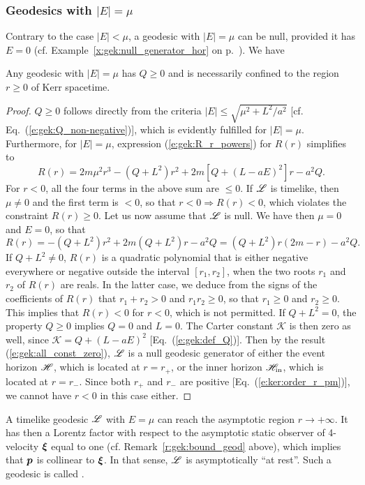 \subsubsection{Geodesics with $|E|=\mu$}

Contrary to the case $|E|<\mu$, a geodesic with $|E|=\mu$ can be null,
provided it has $E=0$
(cf. Example~\ref{x:gek:null_generator_hor} on p.~\pageref{x:gek:null_generator_hor}).
We have
\begin{prop}
Any geodesic with $|E|=\mu$ has $Q\geq 0$ and is necessarily confined
to the region $r\geq 0$ of Kerr spacetime.
\end{prop}
\begin{proof}
$Q\geq 0$ follows directly from the criteria $|E| \leq \sqrt{\mu^2 + {L^2}/{a^2}}$
[cf. Eq.~(\ref{e:gek:Q_non-negative})],
which is evidently fulfilled for $|E|=\mu$.
Furthermore, for $|E|=\mu$, expression (\ref{e:gek:R_r_powers}) for $R(r)$
simplifies to
\[
    R(r) =  2 m \mu^2 r^3 - (Q + L^2) r^2 + 2m  \left[Q + (L-aE)^2 \right] r - a^2 Q .
\]
For $r<0$, all the four terms in the above sum are $\leq 0$.
If $\mathscr{L}$ is timelike, then $\mu\neq 0$ and the first term is $<0$, so that
$r<0 \Longrightarrow R(r) < 0$, which violates the constraint
$R(r) \geq 0$. Let us now assume that $\mathscr{L}$ is null.
We have then $\mu=0$ and $E=0$, so that
\[
    R(r) = - (Q + L^2) r^2 + 2m  (Q + L^2) r -a^2 Q = (Q+L^2) r ( 2m - r) -a^2 Q.
\]
If $Q + L^2 \neq 0$, $R(r)$ is a quadratic polynomial that is
either negative everywhere or negative outside the interval $[r_1, r_2]$,
when the two roots $r_1$ and $r_2$ of $R(r)$ are reals. In the latter case, we deduce
from the signs of the coefficients of $R(r)$ that $r_1+r_2 > 0$ and $r_1 r_2 \geq 0$,
so that $r_1 \geq 0$ and $r_2 \geq 0$. This implies that $R(r) < 0$ for
$r<0$, which is not permitted.
If $Q + L^2 = 0$, the property $Q\geq 0$ implies $Q=0$ and $L = 0$.
The Carter constant $\mathscr{K}$ is then zero as well, since
$\mathscr{K} = Q + (L - a E)^2$ [Eq.~(\ref{e:gek:def_Q})].
Then by the result (\ref{e:gek:all_const_zero}), $\mathscr{L}$ is a null geodesic
generator of either the event horizon $\mathscr{H}$, which is located at $r=r_+$,
or the inner horizon $\mathscr{H}_{\rm in}$, which is located at $r=r_-$.
Since both $r_+$ and $r_-$ are positive
[Eq.~(\ref{e:ker:order_r_pm})], we cannot have $r<0$ in this case either.
\end{proof}

A timelike geodesic $\mathscr{L}$ with $E=\mu$ can reach the asymptotic region
$r\to +\infty$. It has then a Lorentz factor
with respect to the asymptotic static observer of 4-velocity $\bm{\xi}$
equal to one (cf. Remark~\ref{r:gek:bound_geod} above), which implies that
$\bm{p}$ is collinear to $\bm{\xi}$. In that sense, $\mathscr{L}$
is asymptotically ``at rest''. Such a geodesic is called
.



